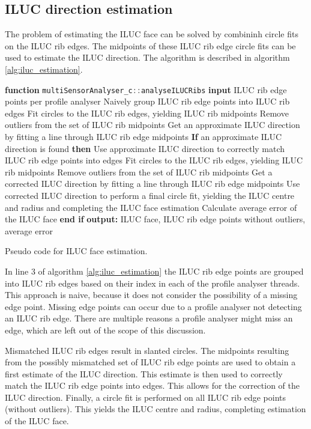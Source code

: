 \subsection{ILUC direction estimation}
The problem of estimating the ILUC face can be solved by combininh circle fits on the ILUC rib edges. The midpoints of these ILUC rib edge circle fits can be used to estimate the ILUC direction. The algorithm is described in algorithm \ref{alg:iluc_estimation}.
\begin{algorithm}[H]
    \begin{algorithmic}[1]
        \State \textbf{function} \lstinline[language=C]|multiSensorAnalyser_c::analyseILUCRibs|
        \State \textbf{input} ILUC rib edge points per profile analyser
        \State Naively group ILUC rib edge points into ILUC rib edges
        \State Fit circles to the ILUC rib edges, yielding ILUC rib midpoints
        \State Remove outliers from the set of ILUC rib midpoints
        \State Get an approximate ILUC direction by fitting a line through ILUC rib edge midpoints
        \State \textbf{If} an approximate ILUC direction is found \textbf{then}
        \State \quad Use approximate ILUC direction to correctly match ILUC rib edge points into edges
        \State \quad Fit circles to the ILUC rib edges, yielding ILUC rib midpoints
        \State \quad Remove outliers from the set of ILUC rib midpoints
        \State \quad Get a corrected ILUC direction by fitting a line through ILUC rib edge midpoints
        \State \quad Use corrected ILUC direction to perform a final circle fit, yielding the ILUC centre and radius and completing the ILUC face estimation
        \State \quad Calculate average error of the ILUC face
        \State \textbf{end if}
        \State \textbf{output: } ILUC face, ILUC rib edge points without outliers, average error
    \end{algorithmic}
    \caption{Pseudo code for ILUC face estimation.}
    \label{alg:iluc_estimation}
\end{algorithm}
In line 3 of algorithm \ref{alg:iluc_estimation} the ILUC rib edge points are grouped into ILUC rib edges based on their index in each of the profile analyser threads. This approach is naive, because it does not consider the possibility of a missing edge point. Missing edge points can occur due to a profile analyser not detecting an ILUC rib edge. There are multiple reasons a profile analyser might miss an edge, which are left out of the scope of this discussion.

Mismatched ILUC rib edges result in slanted circles. The midpoints resulting from the possibly mismatched set of ILUC rib edge points are used to obtain a first estimate of the ILUC direction. This estimate is then used to correctly match the ILUC rib edge points into edges. This allows for the correction of the ILUC direction. Finally, a circle fit is performed on all ILUC rib edge points (without outliers). This yields the ILUC centre and radius, completing estimation of the ILUC face.

